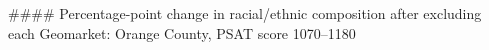 #### Percentage-point change in racial/ethnic composition after excluding each Geomarket: Orange County, PSAT score 1070–1180
